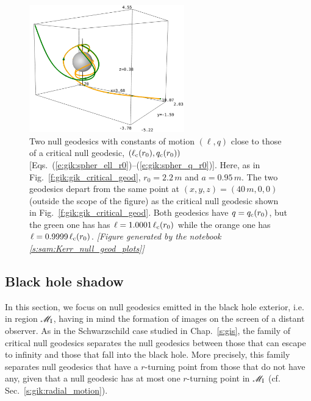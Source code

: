 \begin{figure}
\centerline{\includegraphics[width=0.6\textwidth]{gik_close_critical.png}}
\caption[]{\label{f:gik:close_critical} \footnotesize
Two null geodesics with constants of motion $(\ell,q)$ close
to those of a critical null
geodesic, $(\ell_{\rm c}(r_0),q_{\rm c}(r_0))$
[Eqs.~(\ref{e:gik:spher_ell_r0})--(\ref{e:gik:spher_q_r0})]. Here,
as in Fig.~\ref{f:gik:gik_critical_geod}, $r_0=2.2\, m$ and $a=0.95\, m$.
The two geodesics depart from the
same point at $(x,y,z)=(40\, m, 0, 0)$ (outside the scope of the figure)
as the critical null geodesic shown in Fig.~\ref{f:gik:gik_critical_geod}.
Both geodesics have $q = q_{\rm c}(r_0)$, but the green one has
has $\ell = 1.0001\,\ell_{\rm c}(r_0)$
while the orange one has $\ell = 0.9999\,\ell_{\rm c}(r_0)$.
\textsl{[Figure generated by the notebook \ref{s:sam:Kerr_null_geod_plots}]}
}
\end{figure}



\subsection{Black hole shadow}

In this section, we focus on null geodesics emitted in the black hole
exterior, i.e. in region $\mathscr{M}_{\rm I}$, having in mind the formation
of images on the screen of a distant observer.
As in the Schwarzschild case studied in Chap.~\ref{s:gis}, the family
of critical null geodesics separates the null geodesics between those
that can escape to infinity and those that fall into the black hole.
More precisely, this family separates null geodesics that have a $r$-turning
point from those that do not have any, given that a null geodesic has at most
one $r$-turning point in $\mathscr{M}_{\rm I}$ (cf. Sec.~\ref{s:gik:radial_motion}).

